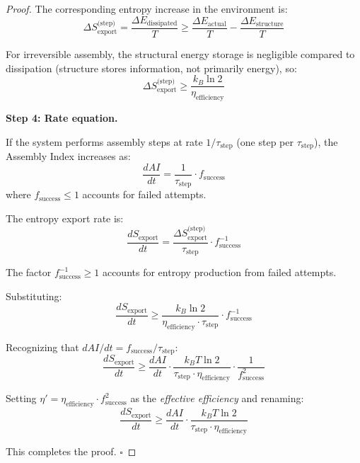 \documentclass[11pt,a4paper]{article}
\begin{document}
\begin{proof}
The corresponding entropy increase in the environment is:
\begin{equation}
\Delta S_{\text{export}}^{\text{(step)}} = \frac{\Delta E_{\text{dissipated}}}{T} \geq \frac{\Delta E_{\text{actual}}}{T} - \frac{\Delta E_{\text{structure}}}{T}
\end{equation}

For irreversible assembly, the structural energy storage is negligible compared to dissipation (structure stores information, not primarily energy), so:
\begin{equation}
\Delta S_{\text{export}}^{\text{(step)}} \geq \frac{k_B \ln 2}{\eta_{\text{efficiency}}}
\end{equation}

\textbf{Step 4: Rate equation.}

If the system performs assembly steps at rate $1/\tau_{\text{step}}$ (one step per $\tau_{\text{step}}$), the Assembly Index increases as:
\begin{equation}
\frac{dAI}{dt} = \frac{1}{\tau_{\text{step}}} \cdot f_{\text{success}}
\end{equation}
where $f_{\text{success}} \leq 1$ accounts for failed attempts.

The entropy export rate is:
\begin{equation}
\frac{dS_{\text{export}}}{dt} = \frac{\Delta S_{\text{export}}^{\text{(step)}}}{\tau_{\text{step}}} \cdot f_{\text{success}}^{-1}
\end{equation}

The factor $f_{\text{success}}^{-1} \geq 1$ accounts for entropy production from failed attempts.

Substituting:
\begin{equation}
\frac{dS_{\text{export}}}{dt} \geq \frac{k_B \ln 2}{\eta_{\text{efficiency}} \cdot \tau_{\text{step}}} \cdot f_{\text{success}}^{-1}
\end{equation}

Recognizing that $dAI/dt = f_{\text{success}}/\tau_{\text{step}}$:
\begin{equation}
\frac{dS_{\text{export}}}{dt} \geq \frac{dAI}{dt} \cdot \frac{k_B T \ln 2}{\tau_{\text{step}} \cdot \eta_{\text{efficiency}}} \cdot \frac{1}{f_{\text{success}}^2}
\end{equation}

Setting $\eta' = \eta_{\text{efficiency}} \cdot f_{\text{success}}^2$ as the \emph{effective efficiency} and renaming:
\begin{equation}
\frac{dS_{\text{export}}}{dt} \geq \frac{dAI}{dt} \cdot \frac{k_B T \ln 2}{\tau_{\text{step}} \cdot \eta_{\text{efficiency}}}
\end{equation}

This completes the proof. \hfill $\square$
\end{proof}
\end{document}
